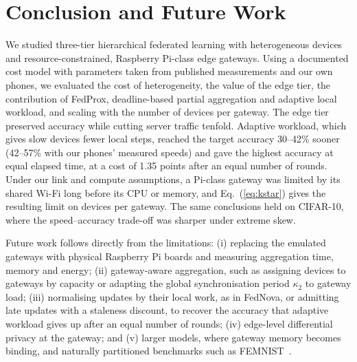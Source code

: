 \documentclass[conference]{IEEEtran}
\begin{document}
\section{Conclusion and Future Work}
\label{sec:conclusion}

We studied three-tier hierarchical federated learning with heterogeneous devices and resource-constrained, Raspberry Pi-class edge gateways. Using a documented cost model with parameters taken from published measurements and our own phones, we evaluated the cost of heterogeneity, the value of the edge tier, the contribution of FedProx, deadline-based partial aggregation and adaptive local workload, and scaling with the number of devices per gateway. The edge tier preserved accuracy while cutting server traffic tenfold. Adaptive workload, which gives slow devices fewer local steps, reached the target accuracy 30--42\% sooner (42--57\% with our phones' measured speeds) and gave the highest accuracy at equal elapsed time, at a cost of 1.35 points after an equal number of rounds. Under our link and compute assumptions, a Pi-class gateway was limited by its shared Wi-Fi long before its CPU or memory, and Eq.~(\ref{eq:kstar}) gives the resulting limit on devices per gateway. The same conclusions held on CIFAR-10, where the speed--accuracy trade-off was sharper under extreme skew.

Future work follows directly from the limitations: (i) replacing the emulated gateways with physical Raspberry Pi boards and measuring aggregation time, memory and energy; (ii) gateway-aware aggregation, such as assigning devices to gateways by capacity or adapting the global synchronisation period $\kappa_2$ to gateway load; (iii) normalising updates by their local work, as in FedNova, or admitting late updates with a staleness discount, to recover the accuracy that adaptive workload gives up after an equal number of rounds; (iv) edge-level differential privacy at the gateway; and (v) larger models, where gateway memory becomes binding, and naturally partitioned benchmarks such as FEMNIST~\cite{caldas2018leaf}.
\end{document}
